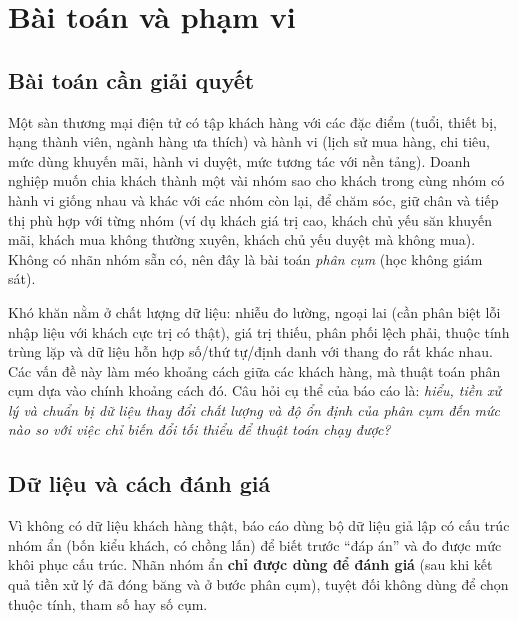 \section{Bài toán và phạm vi}
\label{sec:intro}

\subsection{Bài toán cần giải quyết}
Một sàn thương mại điện tử có tập khách hàng với các đặc điểm (tuổi, thiết bị, hạng thành viên, ngành hàng ưa thích) và hành vi (lịch sử mua hàng, chi tiêu, mức dùng khuyến mãi, hành vi duyệt, mức tương tác với nền tảng).
Doanh nghiệp muốn chia khách thành một vài nhóm sao cho khách trong cùng nhóm có hành vi giống nhau và khác với các nhóm còn lại, để chăm sóc, giữ chân và tiếp thị phù hợp với từng nhóm (ví dụ khách giá trị cao, khách chủ yếu săn khuyến mãi,
khách mua không thường xuyên, khách chủ yếu duyệt mà không mua). Không có nhãn nhóm sẵn có, nên đây là bài toán \emph{phân cụm} (học không giám sát).

Khó khăn nằm ở chất lượng dữ liệu: nhiễu đo lường, ngoại lai (cần phân biệt lỗi nhập liệu với khách cực trị có thật), giá trị thiếu, phân phối lệch phải, thuộc tính trùng lặp và dữ liệu hỗn hợp số/thứ tự/định danh với thang đo rất khác nhau.
Các vấn đề này làm méo khoảng cách giữa các khách hàng, mà thuật toán phân cụm dựa vào chính khoảng cách đó. Câu hỏi cụ thể của báo cáo là: \emph{hiểu, tiền xử lý và chuẩn bị dữ liệu thay đổi chất lượng và độ ổn định của phân cụm đến mức nào so với việc chỉ biến đổi tối thiểu để thuật toán chạy được?}

\subsection{Dữ liệu và cách đánh giá}
Vì không có dữ liệu khách hàng thật, báo cáo dùng bộ dữ liệu giả lập có cấu trúc nhóm ẩn (bốn kiểu khách, có chồng lấn) để biết trước ``đáp án'' và đo được mức khôi phục cấu trúc. Nhãn nhóm ẩn \textbf{chỉ được dùng để đánh giá} (sau khi kết quả tiền xử lý đã đóng băng và ở bước phân cụm),
tuyệt đối không dùng để chọn thuộc tính, tham số hay số cụm.

